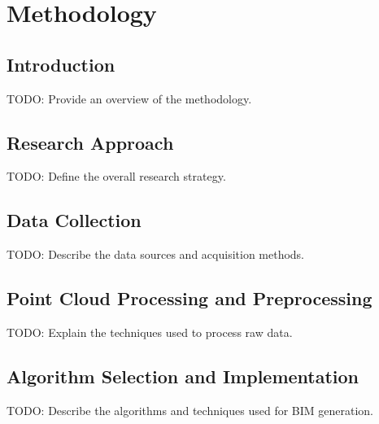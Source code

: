 \chapter{Methodology}
\label{sec:methodology}


\section{Introduction}
TODO: Provide an overview of the methodology.

\section{Research Approach}
TODO: Define the overall research strategy.

\section{Data Collection}
TODO: Describe the data sources and acquisition methods.

\section{Point Cloud Processing and Preprocessing}
TODO: Explain the techniques used to process raw data.

\section{Algorithm Selection and Implementation}
TODO: Describe the algorithms and techniques used for BIM generation.

